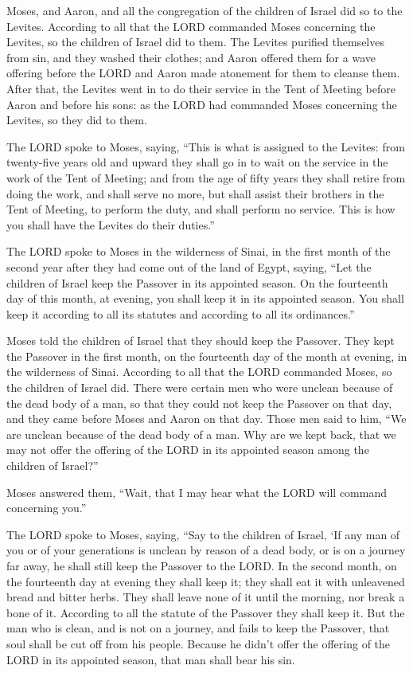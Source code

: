 \myverse{}Moses, and Aaron, and all the congregation of the children of
Israel did so to the Levites. According to all that the LORD commanded Moses concerning the Levites, so
the children of Israel did to them.
\myverse{}The Levites purified themselves from sin, and they washed their clothes; and
Aaron offered them for a wave offering before the LORD and Aaron made atonement for them to cleanse them.
\myverse{}After that, the Levites went in to do their service in the Tent of Meeting
before Aaron and before his sons: as the LORD had commanded Moses concerning the Levites, so they did
to them.


\myverse{}The LORD spoke to Moses, saying,
\myverse{}“This is what is assigned to the Levites: from twenty-five years old and upward
they shall go in to wait on the service in the work of the Tent of Meeting;
\myverse{}and from the age of fifty years they shall retire from doing the work, and
shall serve no more,
\myverse{}but shall assist their brothers in the Tent of Meeting, to perform the duty,
and shall perform no service. This is how you shall have the Levites do their duties.”


\mychapter{} \myverse*{}The LORD spoke to Moses in the wilderness of Sinai, in the first
month of the second year after they had come out of the land of Egypt, saying,
\myverse{}“Let the children of Israel keep the Passover in its appointed season.
\myverse{}On the fourteenth day of this month, at evening, you shall keep it in its appointed
season. You shall keep it according to all its statutes and according to all its ordinances.”


\myverse{}Moses told the children of Israel that they should keep the Passover.
\myverse{}They kept the Passover in the first month, on the fourteenth day of the month
at evening, in the wilderness of Sinai. According to all that the LORD commanded Moses, so the children
of Israel did.
\myverse{}There were certain men who were unclean because of the dead body of a man, so
that they could not keep the Passover on that day, and they came before Moses and Aaron on that day.
\myverse{}Those men said to him, “We are unclean because of the dead body of a man. Why
are we kept back, that we may not offer the offering of the LORD in its appointed season among the children
of Israel?”


\myverse{}Moses answered them, “Wait, that I may hear what the LORD will
command concerning you.”


\myverse{}The LORD spoke to Moses, saying,
\myverse{}“Say to the children of Israel, ‘If any man of you or of your generations
is unclean by reason of a dead body, or is on a journey far away, he shall still keep the Passover to
the LORD.
\myverse{}In the second month, on the fourteenth day at evening they shall keep it;
they shall eat it with unleavened bread and bitter herbs.
\myverse{}They shall leave none of it until the morning, nor break a bone of it. According
to all the statute of the Passover they shall keep it.
\myverse{}But the man who is clean, and is not on a journey, and fails to keep the Passover,
that soul shall be cut off from his people. Because he didn’t offer the offering of the LORD in its appointed
season, that man shall bear his sin.


